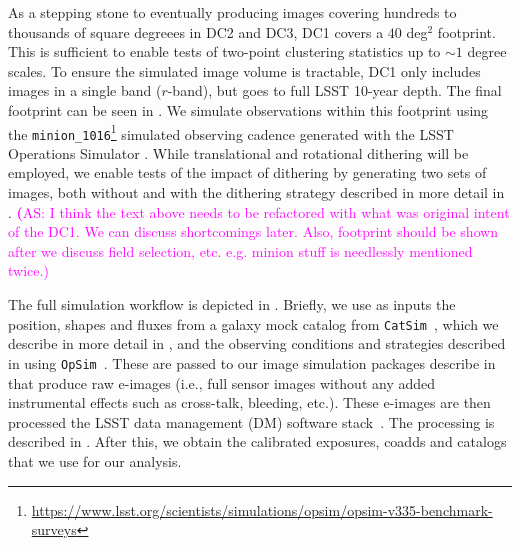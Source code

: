 \documentclass[twocolumn]{aastex62}
\newcommand{\as}[1]{{\textcolor{magenta}{{\textbf (AS: #1)}}}}
\begin{document}
As a stepping stone to eventually producing images covering hundreds to thousands of square degreees
in DC2 and DC3, DC1 covers a $40$ deg$^2$ footprint.  This is sufficient to enable tests of
two-point clustering statistics up to $\sim 1$ degree scales.  To ensure the simulated image volume is
tractable, DC1 only includes images in a single band ($r$-band), but goes to full LSST 10-year
depth. The final footprint can be seen in . We simulate observations within this
footprint using the
\texttt{minion\_1016}\footnote{\url{https://www.lsst.org/scientists/simulations/opsim/opsim-v335-benchmark-surveys}}
simulated observing cadence generated with the LSST Operations Simulator
\citep[OpSim;][]{2014SPIE.9150E..15D}.  While translational and rotational dithering will be employed,
we enable tests of the impact of dithering by generating two sets of images, both without and with
the dithering strategy described in more detail in .
\as{I think the text above needs to be refactored with what was
  original intent of the DC1. We can discuss shortcomings later.
Also, footprint should be shown after we discuss field selection, etc. e.g. minion stuff is needlessly mentioned twice.}


The full simulation workflow is depicted in . Briefly, we use as inputs the position, shapes and fluxes from a galaxy mock catalog from \texttt{CatSim}~\citep{2010SPIE.7738E..1OC,2014SPIE.9150E..14C}, which we describe in more detail in , and the observing conditions and strategies described in  using \texttt{OpSim}~\citep{2014SPIE.9150E..15D}. These are passed to our image simulation packages describe in  that produce raw e-images (i.e., full sensor images without any added instrumental effects such as cross-talk, bleeding, etc.). These e-images are then processed the LSST data management (DM) software stack~\citep{2015arXiv151207914J}. The processing is described in . After this, we obtain the calibrated exposures, coadds and catalogs that we use for our analysis.
\end{document}
